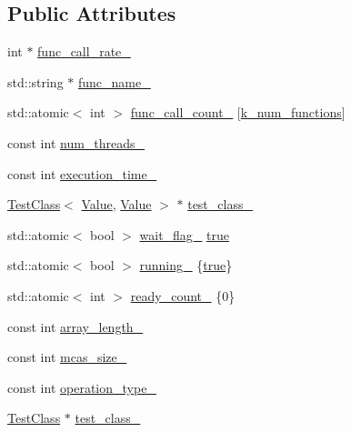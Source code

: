 \subsection*{Public Attributes}
\begin{DoxyCompactItemize}
\item 
int $\ast$ \hyperlink{class_test_object_ad069dbfc17e738bda7f5ef0a976aab30}{func\+\_\+call\+\_\+rate\+\_\+}
\item 
std\+::string $\ast$ \hyperlink{class_test_object_a0824981875a52434332860af996f4ffb}{func\+\_\+name\+\_\+}
\item 
std\+::atomic$<$ int $>$ \hyperlink{class_test_object_ad94d908ecb400ec8d82cb566bcdd4565}{func\+\_\+call\+\_\+count\+\_\+} \mbox{[}\hyperlink{class_test_object_a2eafe110f35fcae7fa739cd52f02392a}{k\+\_\+num\+\_\+functions}\mbox{]}
\item 
const int \hyperlink{class_test_object_aad9fb886d54e6c7eeb9685d0d89854b0}{num\+\_\+threads\+\_\+}
\item 
const int \hyperlink{class_test_object_a793d9a604b2aba56deb74988227b79da}{execution\+\_\+time\+\_\+}
\item 
\hyperlink{class_test_class}{Test\+Class}$<$ \hyperlink{hash__map_2test_object_8h_ad777bf08d8e2b01df17ba5e3c51ae11f}{Value}, \hyperlink{hash__map_2test_object_8h_ad777bf08d8e2b01df17ba5e3c51ae11f}{Value} $>$ $\ast$ \hyperlink{class_test_object_aff2586a58e6599398218f18cb0fca4f4}{test\+\_\+class\+\_\+}
\item 
std\+::atomic$<$ bool $>$ \hyperlink{class_test_object_a6ccfdc908c6a49be86e380474a3448c0}{wait\+\_\+flag\+\_\+} \hyperlink{class_test_object_a5837b96611f5cc5dc27a4b536831b489}{true}
\item 
std\+::atomic$<$ bool $>$ \hyperlink{class_test_object_a6bb349ea0af5dc9a56214b3ba911d544}{running\+\_\+} \{\hyperlink{class_test_object_a5837b96611f5cc5dc27a4b536831b489}{true}\}
\item 
std\+::atomic$<$ int $>$ \hyperlink{class_test_object_aacfa3985ea1d4427319f97cc813d2a91}{ready\+\_\+count\+\_\+} \{0\}
\item 
const int \hyperlink{class_test_object_a3ecf0e2547599d03b0f51f2b3360dfe9}{array\+\_\+length\+\_\+}
\item 
const int \hyperlink{class_test_object_aafa8d7cb90fc81d821f1788af2959ac6}{mcas\+\_\+size\+\_\+}
\item 
const int \hyperlink{class_test_object_a034546a627911670749ab574d92831b5}{operation\+\_\+type\+\_\+}
\item 
\hyperlink{class_test_class}{Test\+Class} $\ast$ \hyperlink{class_test_object_a7e8e641112366f90c14d458b6167bee1}{test\+\_\+class\+\_\+}

\end{DoxyCompactItemize}
